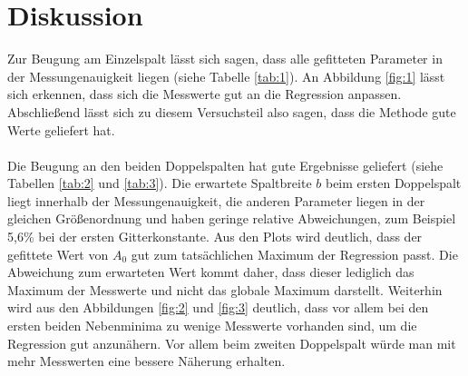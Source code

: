 \section{Diskussion}
Zur Beugung am Einzelspalt lässt sich sagen, dass alle gefitteten Parameter in der
Messungenauigkeit liegen (siehe Tabelle \ref{tab:1}). An Abbildung \ref{fig:1} lässt sich erkennen, dass sich die Messwerte
gut an die Regression anpassen. Abschließend lässt sich zu diesem Versuchsteil also sagen, dass
die Methode gute Werte geliefert hat. \\
\\
Die Beugung an den beiden Doppelspalten hat gute Ergebnisse geliefert (siehe Tabellen \ref{tab:2} und \ref{tab:3}).
Die erwartete Spaltbreite $b$ beim ersten Doppelspalt liegt innerhalb der Messungenauigkeit,
die anderen Parameter liegen in der gleichen Größenordnung und haben geringe relative Abweichungen,
zum Beispiel 5,6\% bei der ersten Gitterkonstante. Aus den Plots wird deutlich, dass der gefittete Wert von $A_0$
gut zum tatsächlichen Maximum der Regression passt. Die Abweichung zum erwarteten Wert kommt daher,
dass dieser lediglich das Maximum der Messwerte und nicht das globale Maximum darstellt. Weiterhin wird aus den Abbildungen \ref{fig:2} und \ref{fig:3}
deutlich, dass vor allem bei den ersten beiden Nebenminima zu wenige Messwerte vorhanden sind,
um die Regression gut anzunähern. Vor allem beim zweiten Doppelspalt würde man mit mehr Messwerten
eine bessere Näherung erhalten.
\newpage
\nocite{*}
\printbibliography
